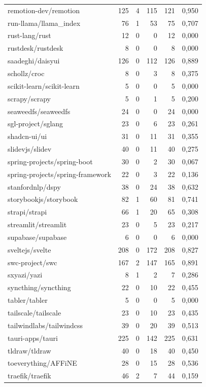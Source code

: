 \begin{tabular}{lrrrrr}
remotion-dev/remotion & 125 & 4 & 115 & 121 & 0,950 \\
run-llama/llama\_index & 76 & 1 & 53 & 75 & 0,707 \\
rust-lang/rust & 12 & 0 & 0 & 12 & 0,000 \\
rustdesk/rustdesk & 8 & 0 & 0 & 8 & 0,000 \\
saadeghi/daisyui & 126 & 0 & 112 & 126 & 0,889 \\
schollz/croc & 8 & 0 & 3 & 8 & 0,375 \\
scikit-learn/scikit-learn & 5 & 0 & 0 & 5 & 0,000 \\
scrapy/scrapy & 5 & 0 & 1 & 5 & 0,200 \\
seaweedfs/seaweedfs & 24 & 0 & 0 & 24 & 0,000 \\
sgl-project/sglang & 23 & 0 & 6 & 23 & 0,261 \\
shadcn-ui/ui & 31 & 0 & 11 & 31 & 0,355 \\
slidevjs/slidev & 40 & 0 & 11 & 40 & 0,275 \\
spring-projects/spring-boot & 30 & 0 & 2 & 30 & 0,067 \\
spring-projects/spring-framework & 22 & 0 & 3 & 22 & 0,136 \\
stanfordnlp/dspy & 38 & 0 & 24 & 38 & 0,632 \\
storybookjs/storybook & 82 & 1 & 60 & 81 & 0,741 \\
strapi/strapi & 66 & 1 & 20 & 65 & 0,308 \\
streamlit/streamlit & 23 & 0 & 5 & 23 & 0,217 \\
supabase/supabase & 6 & 0 & 0 & 6 & 0,000 \\
sveltejs/svelte & 208 & 0 & 172 & 208 & 0,827 \\
swc-project/swc & 167 & 2 & 147 & 165 & 0,891 \\
sxyazi/yazi & 8 & 1 & 2 & 7 & 0,286 \\
syncthing/syncthing & 22 & 0 & 10 & 22 & 0,455 \\
tabler/tabler & 5 & 0 & 0 & 5 & 0,000 \\
tailscale/tailscale & 23 & 0 & 10 & 23 & 0,435 \\
tailwindlabs/tailwindcss & 39 & 0 & 20 & 39 & 0,513 \\
tauri-apps/tauri & 225 & 0 & 142 & 225 & 0,631 \\
tldraw/tldraw & 40 & 0 & 18 & 40 & 0,450 \\
toeverything/AFFiNE & 28 & 0 & 15 & 28 & 0,536 \\
traefik/traefik & 46 & 2 & 7 & 44 & 0,159 \\

\end{tabular}
